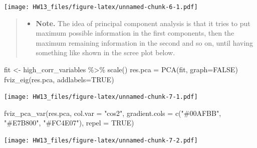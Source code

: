 \documentclass[
]{article}
\newenvironment{Shaded}{\begin{snugshade}}{\end{snugshade}}
\newcommand{\AttributeTok}[1]{\textcolor[rgb]{0.77,0.63,0.00}{#1}}
\newcommand{\CommentTok}[1]{\textcolor[rgb]{0.56,0.35,0.01}{\textit{#1}}}
\newcommand{\ConstantTok}[1]{\textcolor[rgb]{0.00,0.00,0.00}{#1}}
\newcommand{\FunctionTok}[1]{\textcolor[rgb]{0.00,0.00,0.00}{#1}}
\newcommand{\NormalTok}[1]{#1}
\newcommand{\OtherTok}[1]{\textcolor[rgb]{0.56,0.35,0.01}{#1}}
\newcommand{\SpecialCharTok}[1]{\textcolor[rgb]{0.00,0.00,0.00}{#1}}
\newcommand{\StringTok}[1]{\textcolor[rgb]{0.31,0.60,0.02}{#1}}
\providecommand{\tightlist}{%
  \setlength{\itemsep}{0pt}\setlength{\parskip}{0pt}}
\begin{document}
\begin{Shaded}
\end{Shaded}

\texttt{[image: HW13\_files/figure-latex/unnamed-chunk-6-1.pdf]}

\begin{quote}
\begin{itemize}
\tightlist
\item
  \textbf{Note.} The idea of principal component analysis is that it
  tries to put maximum possible information in the first components,
  then the maximum remaining information in the second and so on, until
  having something like shown in the scree plot below.
\end{itemize}
\end{quote}

\begin{Shaded}
\begin{Highlighting}[]
\NormalTok{fit }\OtherTok{\textless{}{-}}\NormalTok{ high\_corr\_variables }\SpecialCharTok{\%\textgreater{}\%} \FunctionTok{scale}\NormalTok{()}
\NormalTok{res.pca }\OtherTok{=} \FunctionTok{PCA}\NormalTok{(fit, }\AttributeTok{graph=}\ConstantTok{FALSE}\NormalTok{)}
\FunctionTok{fviz\_eig}\NormalTok{(res.pca, }\AttributeTok{addlabels=}\ConstantTok{TRUE}\NormalTok{)}
\end{Highlighting}
\end{Shaded}

\texttt{[image: HW13\_files/figure-latex/unnamed-chunk-7-1.pdf]}

\begin{Shaded}
\begin{Highlighting}[]
\FunctionTok{fviz\_pca\_var}\NormalTok{(res.pca, }\AttributeTok{col.var =} \StringTok{"cos2"}\NormalTok{,}
             \AttributeTok{gradient.cols =} \FunctionTok{c}\NormalTok{(}\StringTok{"\#00AFBB"}\NormalTok{, }\StringTok{"\#E7B800"}\NormalTok{, }\StringTok{"\#FC4E07"}\NormalTok{), }
             \AttributeTok{repel =} \ConstantTok{TRUE}\NormalTok{)}
\end{Highlighting}
\end{Shaded}

\texttt{[image: HW13\_files/figure-latex/unnamed-chunk-7-2.pdf]}
\end{document}
